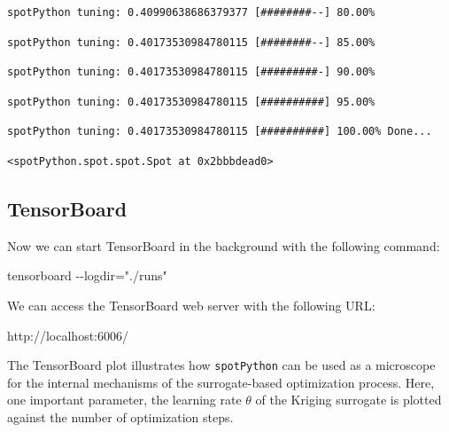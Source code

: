 \documentclass[
  letterpaper,
  DIV=11,
  numbers=noendperiod]{scrreprt}
\newenvironment{Shaded}{\begin{snugshade}}{\end{snugshade}}
\newcommand{\NormalTok}[1]{\textcolor[rgb]{0.00,0.23,0.31}{#1}}
\begin{document}
\begin{verbatim}
spotPython tuning: 0.40990638686379377 [########--] 80.00% 
\end{verbatim}

\begin{verbatim}
spotPython tuning: 0.40173530984780115 [########--] 85.00% 
\end{verbatim}

\begin{verbatim}
spotPython tuning: 0.40173530984780115 [#########-] 90.00% 
\end{verbatim}

\begin{verbatim}
spotPython tuning: 0.40173530984780115 [##########] 95.00% 
\end{verbatim}

\begin{verbatim}
spotPython tuning: 0.40173530984780115 [##########] 100.00% Done...
\end{verbatim}

\begin{verbatim}
<spotPython.spot.spot.Spot at 0x2bbbdead0>
\end{verbatim}

\hypertarget{tensorboard-1}{%
\subsection{TensorBoard}\label{tensorboard-1}}

Now we can start TensorBoard in the background with the following
command:

\begin{Shaded}
\begin{Highlighting}[]
\NormalTok{tensorboard {-}{-}logdir="./runs"}
\end{Highlighting}
\end{Shaded}

We can access the TensorBoard web server with the following URL:

\begin{Shaded}
\begin{Highlighting}[]
\NormalTok{http://localhost:6006/}
\end{Highlighting}
\end{Shaded}

The TensorBoard plot illustrates how \texttt{spotPython} can be used as
a microscope for the internal mechanisms of the surrogate-based
optimization process. Here, one important parameter, the learning rate
\(\theta\) of the Kriging surrogate is plotted against the number of
optimization steps.
\end{document}
